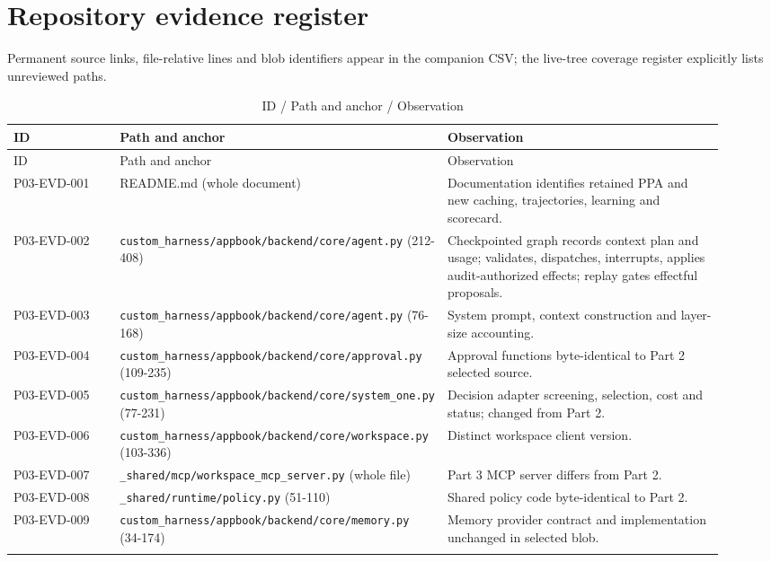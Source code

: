 \documentclass[10pt,letterpaper]{article}
\begin{document}
\section{Repository evidence register}
Permanent source links, file-relative lines and blob identifiers appear in the companion CSV; the live-tree coverage register explicitly lists unreviewed paths.
\begin{longtable}{@{}>{\raggedright\arraybackslash}p{0.16\linewidth}>{\raggedright\arraybackslash}p{0.34\linewidth}>{\raggedright\arraybackslash}p{0.42\linewidth}@{}}
\caption{ID / Path and anchor / Observation}\\
\toprule ID & Path and anchor & Observation\\\midrule\endfirsthead
\toprule ID & Path and anchor & Observation\\\midrule\endhead
P03-EVD-001 & README.md (whole document) & Documentation identifies retained PPA and new caching, trajectories, learning and scorecard.\\\addlinespace
P03-EVD-002 & \nolinkurl{custom_harness/appbook/backend/core/agent.py} (212-408) & Checkpointed graph records context plan and usage; validates, dispatches, interrupts, applies audit-authorized effects; replay gates effectful proposals.\\\addlinespace
P03-EVD-003 & \nolinkurl{custom_harness/appbook/backend/core/agent.py} (76-168) & System prompt, context construction and layer-size accounting.\\\addlinespace
P03-EVD-004 & \nolinkurl{custom_harness/appbook/backend/core/approval.py} (109-235) & Approval functions byte-identical to Part 2 selected source.\\\addlinespace
P03-EVD-005 & \nolinkurl{custom_harness/appbook/backend/core/system_one.py} (77-231) & Decision adapter screening, selection, cost and status; changed from Part 2.\\\addlinespace
P03-EVD-006 & \nolinkurl{custom_harness/appbook/backend/core/workspace.py} (103-336) & Distinct workspace client version.\\\addlinespace
P03-EVD-007 & \nolinkurl{_shared/mcp/workspace_mcp_server.py} (whole file) & Part 3 MCP server differs from Part 2.\\\addlinespace
P03-EVD-008 & \nolinkurl{_shared/runtime/policy.py} (51-110) & Shared policy code byte-identical to Part 2.\\\addlinespace
P03-EVD-009 & \nolinkurl{custom_harness/appbook/backend/core/memory.py} (34-174) & Memory provider contract and implementation unchanged in selected blob.\\\addlinespace

\end{longtable}
\end{document}
